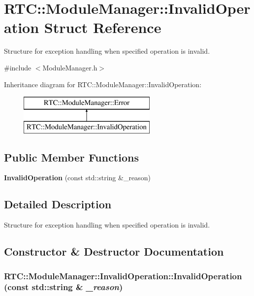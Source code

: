 \section{RTC::ModuleManager::InvalidOperation Struct Reference}
\label{structRTC_1_1ModuleManager_1_1InvalidOperation}


Structure for exception handling when specified operation is invalid.  




{\ttfamily \#include $<$ModuleManager.h$>$}

Inheritance diagram for RTC::ModuleManager::InvalidOperation:\begin{figure}[H]
\begin{center}
\leavevmode
\includegraphics[height=2cm]{structRTC_1_1ModuleManager_1_1InvalidOperation}
\end{center}
\end{figure}
\subsection*{Public Member Functions}
\begin{DoxyCompactItemize}
\item 
{\bf InvalidOperation} (const std::string \&\_\-reason)
\end{DoxyCompactItemize}


\subsection{Detailed Description}
Structure for exception handling when specified operation is invalid. 

\subsection{Constructor \& Destructor Documentation}
\subsubsection[{InvalidOperation}]{\setlength{\rightskip}{0pt plus 5cm}RTC::ModuleManager::InvalidOperation::InvalidOperation (const std::string \& {\em \_\-reason})\hspace{0.3cm}{\ttfamily  [inline]}}\label{structRTC_1_1ModuleManager_1_1InvalidOperation_a49b14ed508206f3f05a14bcc5811de4a}
